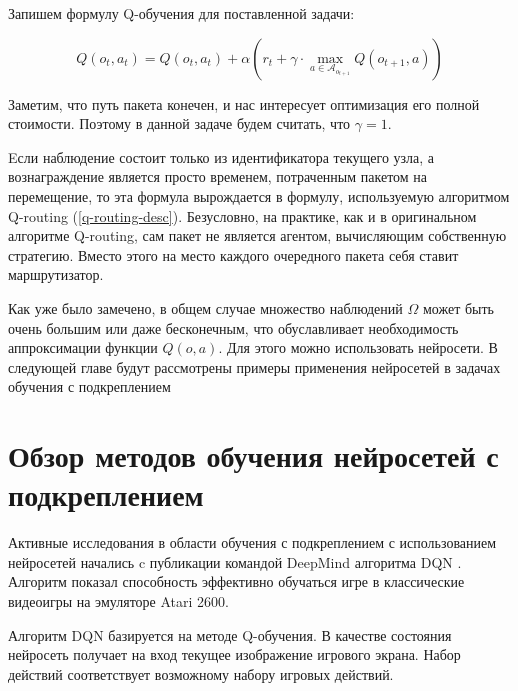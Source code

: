 \documentclass[specification, annotation]{itmo-student-thesis}
\begin{document}
Запишем формулу Q-обучения для поставленной задачи:

\[
Q(o_t, a_t) = Q(o_t, a_t) + \alpha \left( r_t +
\gamma \cdot \max\limits_{a \in \mathcal{A}_{o_{t+1}}} Q(o_{t+1}, a) \right)
\]

Заметим, что путь пакета конечен, и нас интересует оптимизация его полной
стоимости. Поэтому в данной задаче будем считать, что $\gamma = 1$.

Eсли наблюдение состоит только из идентификатора текущего
узла, а вознаграждение является просто временем, потраченным пакетом на
перемещение, то эта формула вырождается в формулу, используемую алгоритмом
Q-routing (\ref{q-routing-desc}). Безусловно, на практике, как и в оригинальном
алгоритме Q-routing, сам пакет не является агентом, вычисляющим собственную
стратегию. Вместо этого на место каждого очередного пакета себя ставит
маршрутизатор.

Как уже было замечено, в общем случае множество наблюдений $\Omega$ может быть
очень большим или даже бесконечным, что обуславливает необходимость
аппроксимации функции $Q(o, a)$. Для этого можно использовать нейросети. В
следующей главе будут рассмотрены примеры применения нейросетей в задачах
обучения с подкреплением

\section{Обзор методов обучения нейросетей с подкреплением}\label{overview:nns}

Активные исследования в области обучения с подкреплением с использованием
нейросетей начались c публикации командой DeepMind алгоритма
DQN \cite{deepmind-dqn-orig}. Алгоритм показал способность эффективно обучаться
игре в классические видеоигры на эмуляторе Atari 2600. 

Алгоритм DQN базируется на методе Q-обучения. В качестве состояния нейросеть
получает на вход текущее изображение игрового экрана. Набор действий
соответствует возможному набору игровых действий.
\end{document}
